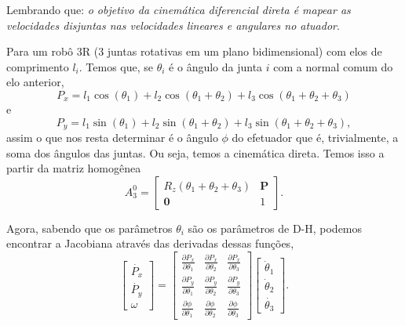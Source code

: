 
Lembrando que: \emph{o objetivo da cinemática diferencial direta é mapear as velocidades disjuntas nas velocidades lineares e angulares no atuador}.

\begin{eg}
    Para um robô 3R (3 juntas rotativas em um plano bidimensional) com elos de comprimento $l_i$. Temos que, se $\theta_i$ é o ângulo da junta $i$ com a normal comum do elo anterior, \[
    P_x = l_1\cos\left( \theta_1 \right) + l_2\cos\left( \theta_1  + \theta_2\right) + l_3\cos\left( \theta_1 + \theta_2 + \theta_3 \right) 
    \] e \[
    P_y = l_1\sin\left( \theta_1 \right) + l_2\sin\left( \theta_1  + \theta_2\right) + l_3\sin\left( \theta_1 + \theta_2 + \theta_3 \right) 
    ,\] assim o que nos resta determinar é o ângulo $\phi$ do efetuador que é, trivialmente, a soma dos ângulos das juntas. Ou seja, temos a cinemática direta. Temos isso a partir da matriz homogênea \[
    A_3^{0} = \begin{bmatrix} R_z\left( \theta_1 + \theta_2 + \theta_3\right)  & \bm{P} \\ \bm{0} & 1\end{bmatrix} 
    .\]

    Agora, sabendo que os parâmetros $\theta_i$ são os parâmetros de D-H, podemos encontrar a Jacobiana através das derivadas dessas funções, \[
	\begin{bmatrix} \dot{P_x} \\ \dot{P_y} \\ \omega \end{bmatrix} = \begin{bmatrix} \frac{\partial P_x}{\partial \theta_1} & \frac{\partial P_x}{\partial \theta_2} & \frac{\partial P_x}{\partial \theta_3} \\ \frac{\partial P_y}{\partial \theta_1} & \frac{\partial P_y}{\partial \theta_2} & \frac{\partial P_y}{\partial \theta_3} \\ \frac{\partial \phi}{\partial \theta_1} & \frac{\partial \phi}{\partial \theta_2} & \frac{\partial \phi}{\partial \theta_3}   \end{bmatrix} \begin{bmatrix} \dot{\theta}_1 \\ \dot{\theta}_2 \\ \dot{\theta_3} \end{bmatrix} 
    .\] 


\end{eg}
